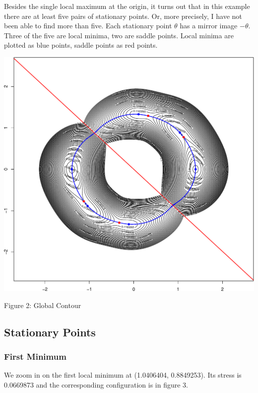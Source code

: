 \documentclass[
  12pt,
]{article}
\begin{document}
Besides the single local maximum at the origin, it turns out that in this example there are at least five pairs of stationary points. Or, more precisely, I have not been able to find more than five. Each stationary point \(\theta\) has a mirror image \(-\theta\). Three of the five are local minima, two are saddle points. Local minima are plotted as blue points, saddle points as red points.

\begin{center}\includegraphics{twoPoints_files/figure-latex/global_contour-1} \end{center}

Figure 2: Global Contour

\subsection{Stationary Points}\label{stationary-points}

\subsubsection{First Minimum}\label{first-minimum}

We zoom in on the first local minimum at (1.0406404, 0.8849253). Its stress is 0.0669873 and the corresponding configuration is in figure 3.
\end{document}
